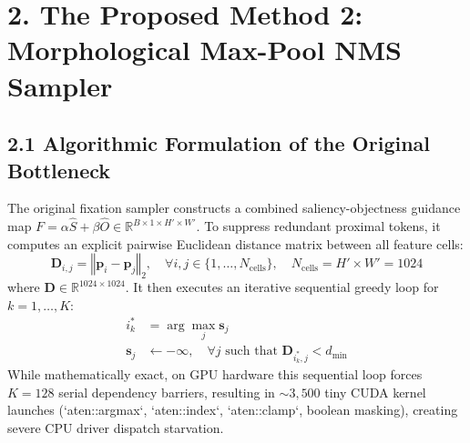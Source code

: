 \documentclass[11pt,a4paper]{article}
\begin{document}
\vspace{0.4em}

\section*{2. The Proposed Method 2: Morphological Max-Pool NMS Sampler}

\subsection*{2.1 Algorithmic Formulation of the Original Bottleneck}
The original fixation sampler constructs a combined saliency-objectness guidance map $F = \alpha \hat{S} + \beta \hat{O} \in \mathbb{R}^{B \times 1 \times H' \times W'}$. To suppress redundant proximal tokens, it computes an explicit pairwise Euclidean distance matrix between all feature cells:
\begin{equation}
    \mathbf{D}_{i,j} = \left\Vert \mathbf{p}_i - \mathbf{p}_j \right\Vert_2, \quad \forall i,j \in \{1, \dots, N_{\text{cells}}\}, \quad N_{\text{cells}} = H' \times W' = 1024
\end{equation}
where $\mathbf{D} \in \mathbb{R}^{1024 \times 1024}$. It then executes an iterative sequential greedy loop for $k = 1, \dots, K$:
\begin{align}
    i^*_k &= \arg\max_{j} \mathbf{s}_j \\
    \mathbf{s}_j &\leftarrow -\infty, \quad \forall j \text{ such that } \mathbf{D}_{i^*_k, j} < d_{\min}
\end{align}
While mathematically exact, on GPU hardware this sequential loop forces $K=128$ serial dependency barriers, resulting in $\sim 3,500$ tiny CUDA kernel launches (`aten::argmax`, `aten::index`, `aten::clamp`, boolean masking), creating severe CPU driver dispatch starvation.
\end{document}
